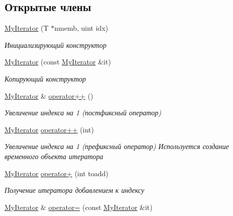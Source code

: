 \subsection*{Открытые члены}
\begin{DoxyCompactItemize}
\item 
\hyperlink{class_network_service_1_1_my_iterator_a0d0c83ad52ec18d29f026ead351562e4}{My\+Iterator} (T $\ast$nmemb, uint idx)
\begin{DoxyCompactList}\small\item\em Инициализирующий конструктор \end{DoxyCompactList}\item 
\hyperlink{class_network_service_1_1_my_iterator_afaab5f5b3b934271e81341e22946159d}{My\+Iterator} (const \hyperlink{class_network_service_1_1_my_iterator}{My\+Iterator} \&it)
\begin{DoxyCompactList}\small\item\em Копирующий конструктор \end{DoxyCompactList}\item 
\hyperlink{class_network_service_1_1_my_iterator}{My\+Iterator} \& \hyperlink{class_network_service_1_1_my_iterator_ae71706eb096475404afa566e8355b439}{operator++} ()
\begin{DoxyCompactList}\small\item\em Увеличение индекса на 1 (постфиксный оператор) \end{DoxyCompactList}\item 
\hyperlink{class_network_service_1_1_my_iterator}{My\+Iterator} \hyperlink{class_network_service_1_1_my_iterator_a3f7fb28a18f0838385163b8bf3ea96d8}{operator++} (int)
\begin{DoxyCompactList}\small\item\em Увеличение индекса на 1 (префиксный оператор) Используется создание временного объекта итератора \end{DoxyCompactList}\item 
\hyperlink{class_network_service_1_1_my_iterator}{My\+Iterator} \hyperlink{class_network_service_1_1_my_iterator_a86a2b003c3396f38b06abecda8b7c8da}{operator+} (int toadd)
\begin{DoxyCompactList}\small\item\em Получение итератора добавлением к индексу \end{DoxyCompactList}\item 
\hyperlink{class_network_service_1_1_my_iterator}{My\+Iterator} \& \hyperlink{class_network_service_1_1_my_iterator_abbcd1a24586f40134de65d2d914e17db}{operator=} (const \hyperlink{class_network_service_1_1_my_iterator}{My\+Iterator} \&it)

\end{DoxyCompactItemize}
